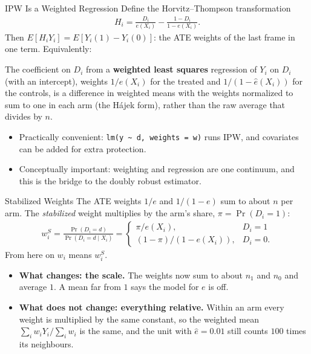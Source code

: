 \documentclass[aspectratio=169,11pt,xcolor=dvipsnames]{beamer}
\newcommand{\E}{E}
\begin{document}
\begin{frame}{IPW Is a Weighted Regression}
Define the \alert{Horvitz--Thompson transformation}
\begin{align*}
  H_i = \frac{D_i}{e(X_i)} - \frac{1-D_i}{1-e(X_i)} .
\end{align*}
Then $\E[H_i Y_i] = \E[Y_i(1)-Y_i(0)]$: the ATE weights of the last frame in
one term. Equivalently:
\begin{block}{}
The coefficient on $D_i$ from a \textbf{weighted least squares} regression of
$Y_i$ on $D_i$ (with an intercept), weights $1/\hat e(X_i)$ for the treated
and $1/(1-\hat e(X_i))$ for the controls, is a difference in weighted means
with the weights normalized to sum to one in each arm (the H\'ajek form),
rather than the raw average that divides by $n$.
\end{block}
\begin{itemize}\itemsep2pt
  \item Practically convenient: \texttt{lm(y \textasciitilde\ d, weights = w)}
        runs IPW, and covariates can be added for extra protection.
  \item Conceptually important: weighting and regression are one continuum,
        and this is the bridge to the doubly robust estimator.
\end{itemize}
\end{frame}

\begin{frame}{Stabilized Weights}
The ATE weights $1/e$ and $1/(1-e)$ sum to about $n$ per arm. The
\emph{stabilized} weight multiplies by the arm's share, $\pi = \Pr(D_i = 1)$:
\begin{align*}
  w_i^{S} = \frac{\Pr(D_i = d)}{\Pr(D_i = d\mid X_i)}
  = \begin{cases} \pi/e(X_i), & D_i = 1 \\ (1-\pi)/(1-e(X_i)), & D_i = 0 . \end{cases}
\end{align*}
From here on $w_i$ means $w_i^S$.
\vskip4pt
\begin{itemize}\itemsep3pt
  \item \textbf{What changes: the scale.} The weights now sum to about $n_1$
        and $n_0$ and average $1$. A mean far from $1$ says the model for $e$
        is off.
  \item \textbf{What does not change: everything relative.} Within an arm
        every weight is multiplied by the same constant, so the weighted mean
        $\sum_i w_iY_i/\sum_i w_i$ is the same, and the unit with
        $\hat e = 0.01$ still counts $100$ times its neighbours.
\end{itemize}
\end{frame}
\end{document}
